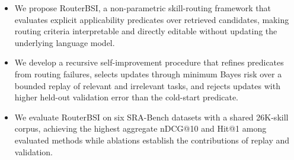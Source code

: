 \begin{itemize}
\setlength{\itemsep}{0pt}
\setlength{\parsep}{0pt}

\item 
We propose RouterBSI, a non-parametric skill-routing framework that evaluates explicit applicability predicates over retrieved candidates, making routing criteria interpretable and directly editable without updating the underlying language model.

\item 
We develop a recursive self-improvement procedure that refines predicates from routing failures, selects updates through minimum Bayes risk over a bounded replay of relevant and irrelevant tasks, and rejects updates with higher held-out validation error than the cold-start predicate.

\item 
We evaluate RouterBSI on six SRA-Bench datasets with a shared 26K-skill corpus, achieving the highest aggregate nDCG@10 and Hit@1 among evaluated methods while ablations establish the contributions of replay and validation.

\end{itemize}
